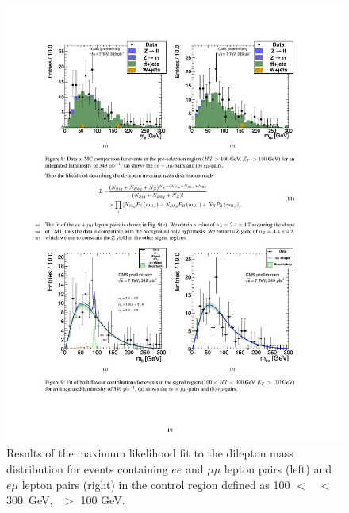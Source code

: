 \begin{figure}[tbh]
\begin{center}
\includegraphics[width=0.75\linewidth]{plots_final/dilmass_control.pdf}
\caption{\label{fig:dilmasscontrol}\protect 
Results of the maximum likelihood fit to the dilepton mass distribution for events containing 
$ee$ and $\mu\mu$ lepton pairs (left) and $e\mu$ lepton pairs (right) in the control
region defined as 100 $<$ \Ht\ $<$ 300~GeV, \MET\ $>$ 100 GeV.
}
\end{center}
\end{figure}

